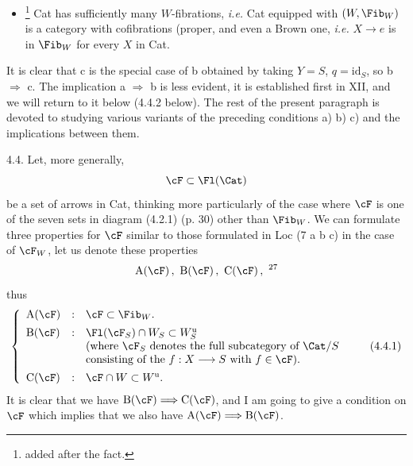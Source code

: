 
\begin{itemize}[leftmargin=4em]
\item[F)] \footnote[26]{added after the fact.} Cat has sufficiently many $W$-fibrations, \textit{i.e.} Cat equipped with $(W, \Fib_W)$ is a category with cofibrations (proper, and even a Brown one, \textit{i.e.} $X \longrightarrow e$ is in $\Fib_W$ for every $X$ in Cat. %
\end{itemize}

It is clear that c is the special case of b obtained by taking $Y = S$, $q = \mathrm{id}_S$, so b $\Longrightarrow$ c. The implication a $\Longrightarrow$ b is less evident, it is established first in XII, and we will return to it below (4.4.2 below). The rest of the present paragraph is devoted to studying various variants of the preceding conditions a) b) c) and the implications between them.


4.4. Let, more generally,
\[
\cF \subset \Fl(\Cat)
\]
be a set of arrows in Cat, thinking more particularly of the case where $\cF$ is one of the seven sets in diagram (4.2.1) (p. 30) other than $\Fib_W$. We can formulate three properties for $\cF$ similar to those formulated in Loc (7 a b c) in the case of $\cF_W$, let us denote these properties
\[
\mathrm{A}(\cF)\,,\ \mathrm{B}(\cF)\,,\ \mathrm{C}(\cF)\,,\ \text{\footnotemark[27]}
\]
thus
\[
\left\{
\begin{array}{lcl}
\mathrm{A}(\cF) & : & \cF \subset \Fib_W. \\[1ex]
\mathrm{B}(\cF) & : & \Fl(\cF_S) \cap W_S \subset W_S^{\mathrm{u}} \\
 & & \text{(where $\cF_S$ denotes the full subcategory of $\Cat/S$} \\
 & & \text{consisting of the $f : X \longrightarrow S$ with $f \in \cF$).} \\[1ex]
\mathrm{C}(\cF) & : & \cF \cap W \subset W^{\mathrm{u}}.
\end{array}
\right.
\tag*{(4.4.1)}
\]
It is clear that we have $\mathrm{B}(\cF) \Longrightarrow \mathrm{C}(\cF)$, and I am going to give a condition on $\cF$ which implies that we also have $\mathrm{A}(\cF) \Longrightarrow \mathrm{B}(\cF)$.


